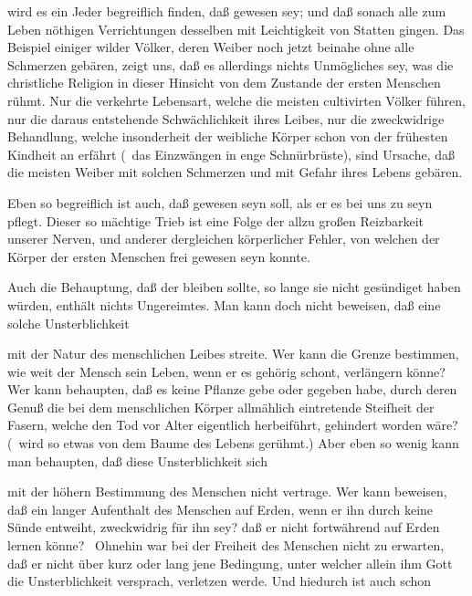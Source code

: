 \begin{aufza}
\item wird es ein Jeder begreiflich finden, daß  gewesen sey; und daß sonach alle zum Leben nöthigen Verrichtungen desselben mit Leichtigkeit von Statten gingen. Das Beispiel einiger wilder Völker, deren Weiber noch jetzt beinahe ohne alle Schmerzen gebären, zeigt uns, daß es allerdings nichts Unmögliches sey, was die christliche Religion in dieser Hinsicht von dem Zustande der ersten Menschen rühmt. Nur die verkehrte Lebensart, welche die meisten cultivirten Völker führen, nur die daraus entstehende Schwächlichkeit ihres Leibes, nur die zweckwidrige Behandlung, welche insonderheit der weibliche Körper schon von der frühesten Kindheit an erfährt (\zB\ das Einzwängen in enge Schnürbrüste), sind Ursache, daß die meisten Weiber mit solchen Schmerzen und mit Gefahr ihres Lebens gebären.
\item Eben so begreiflich ist auch, daß  gewesen seyn soll, als er es bei uns zu seyn pflegt. Dieser so mächtige Trieb ist eine Folge der allzu großen Reizbarkeit unserer Nerven, und anderer dergleichen körperlicher Fehler, von welchen der Körper der ersten Menschen frei gewesen seyn konnte.
\item Auch die Behauptung, daß der  bleiben sollte, so lange sie nicht gesündiget haben würden, enthält nichts Ungereimtes. Man kann doch nicht beweisen, daß eine solche Unsterblichkeit~
\begin{aufzb}
\item mit der Natur des menschlichen Leibes streite. Wer kann die Grenze bestimmen, wie weit der Mensch sein Leben, wenn er es gehörig schont, verlängern könne? Wer kann behaupten, daß es keine Pflanze gebe oder gegeben habe, durch deren Genuß die bei dem menschlichen Körper allmählich eintretende Steifheit der Fasern, welche den Tod vor Alter eigentlich herbeiführt, gehindert worden wäre? (\ wird so etwas von dem Baume des Lebens gerühmt.) Aber eben so wenig kann man behaupten, daß diese Unsterblichkeit sich
\item mit der höhern Bestimmung des Menschen nicht vertrage. Wer kann beweisen, daß ein langer Aufenthalt des Menschen auf Erden, wenn er ihn durch keine Sünde entweiht, zweckwidrig für ihn sey? daß er nicht fortwährend auf Erden lernen könne? \usw\ Ohnehin war bei der Freiheit des Menschen nicht zu erwarten, daß er nicht über kurz oder lang jene Bedingung, unter welcher allein ihm Gott die Unsterblichkeit versprach, verletzen werde. Und hiedurch ist auch schon

\end{aufzb}
\end{aufza}
